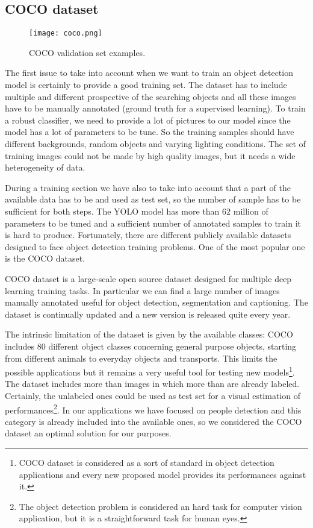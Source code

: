 \documentclass{standalone}
\begin{document}
\subsection[COCO]{COCO dataset}\label{obj_detection:coco}

\begin{center}
\begin{figure}[htbp]
\centering
\texttt{[image: coco.png]}
\caption{COCO validation set examples.
}
\label{fig:coco}
\end{figure}
\end{center}

The first issue to take into account when we want to train an object detection model is certainly to provide a good training set.
The dataset has to include multiple and different prospective of the searching objects and all these images have to be manually annotated (ground truth for a supervised learning).
To train a robust classifier, we need to provide a lot of pictures to our model since the model has a lot of parameters to be tune.
So the training samples should have different backgrounds, random objects and varying lighting conditions.
The set of training images could not be made by high quality images, but it needs a wide heterogeneity of data.

During a training section we have also to take into account that a part of the available data has to be  and used as test set, so the number of sample has to be sufficient for both steps.
The YOLO model has more than $62$ million of parameters to be tuned and a sufficient number of annotated samples to train it is hard to produce.
Fortunately, there are different publicly available datasets designed to face object detection training problems.
One of the most popular one is the COCO dataset.

COCO dataset is a large-scale open source dataset designed for multiple deep learning training tasks.
In particular we can find a large number of images manually annotated useful for object detection, segmentation and captioning.
The dataset is continually updated and a new version is released quite every year.

The intrinsic limitation of the dataset is given by the available classes: COCO includes $80$ different object classes concerning general purpose objects, starting from different animals to everyday objects and transports.
This limits the possible applications but it remains a very useful tool for testing new models\footnote{
  COCO dataset is considered as a sort of standard in object detection applications and every new proposed model provides its performances against it.
}.
The dataset includes more than  images in which more than  are already labeled.
Certainly, the unlabeled ones could be used as test set for a visual estimation of performances\footnote{
  The object detection problem is considered an hard task for computer vision application, but it is a straightforward task for human eyes.
}.
In our applications we have focused on people detection and this category is already included into the available ones, so we considered the COCO dataset an optimal solution for our purposes.
\end{document}
